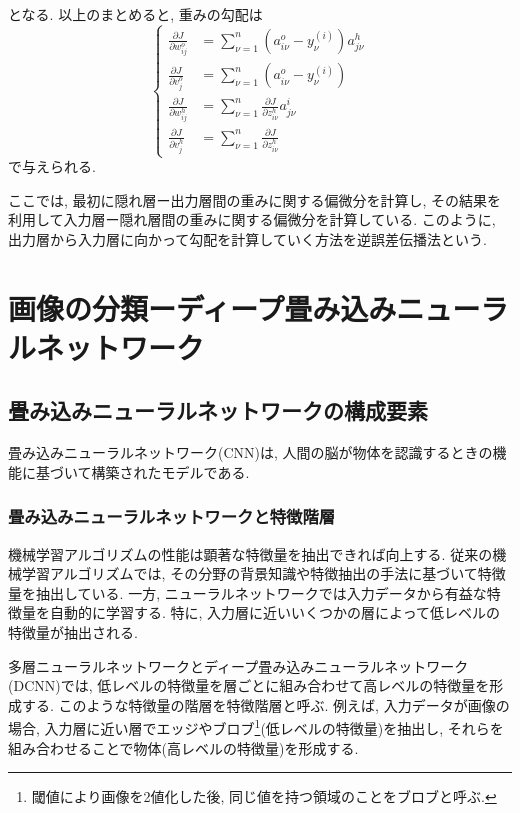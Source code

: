 \documentclass[uplatex]{jsarticle}
\theoremstyle{definition}
\numberwithin{equation}{section}
\begin{document}
となる.
以上のまとめると, 重みの勾配は
\begin{equation}
    \left\{
    \begin{aligned}
        \frac{\partial J}{\partial w^{o}_{ij}}
        &= \sum_{\nu = 1}^{n} (a^{o}_{i\nu} - y^{(i)}_{\nu})a^{h}_{j\nu} \\
        \frac{\partial J}{\partial v^{o}_{j}}
        &= \sum_{\nu = 1}^{n} (a^{o}_{i\nu} - y^{(i)}_{\nu}) \\
        \frac{\partial J}{\partial w^{h}_{ij}}
        &= \sum_{\nu = 1}^{n} \frac{\partial J}{\partial z^{h}_{i\nu}}a^{i}_{j\nu} \\
        \frac{\partial J}{\partial v^{h}_{j}}
        &= \sum_{\nu = 1}^{n} \frac{\partial J}{\partial z^{h}_{i\nu}}
    \end{aligned}
    \right.
\end{equation}
で与えられる.

ここでは, 最初に隠れ層ー出力層間の重みに関する偏微分を計算し, その結果を利用して入力層ー隠れ層間の重みに関する偏微分を計算している.
このように, 出力層から入力層に向かって勾配を計算していく方法を逆誤差伝播法という.


\section{画像の分類ーディープ畳み込みニューラルネットワーク}
\subsection{畳み込みニューラルネットワークの構成要素}
畳み込みニューラルネットワーク(CNN)は, 人間の脳が物体を認識するときの機能に基づいて構築されたモデルである.

\subsubsection{畳み込みニューラルネットワークと特徴階層}
機械学習アルゴリズムの性能は顕著な特徴量を抽出できれば向上する.
従来の機械学習アルゴリズムでは, その分野の背景知識や特徴抽出の手法に基づいて特徴量を抽出している.
一方, ニューラルネットワークでは入力データから有益な特徴量を自動的に学習する.
特に, 入力層に近いいくつかの層によって低レベルの特徴量が抽出される.

多層ニューラルネットワークとディープ畳み込みニューラルネットワーク(DCNN)では, 低レベルの特徴量を層ごとに組み合わせて高レベルの特徴量を形成する.
このような特徴量の階層を特徴階層と呼ぶ.
例えば, 入力データが画像の場合, 入力層に近い層でエッジやブロブ\footnote{閾値により画像を2値化した後, 同じ値を持つ領域のことをブロブと呼ぶ.}(低レベルの特徴量)を抽出し, それらを組み合わせることで物体(高レベルの特徴量)を形成する.
\end{document}
